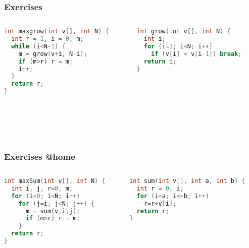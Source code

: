 \documentclass[aspectratio=169]{beamer}
\begin{document}
\begin{frame}[fragile]\frametitle{Exercises}
\begin{columns}
\begin{column}{0.48\textwidth}
\begin{lstlisting}[language=C++,emph={maxgrow,grow}]
int maxgrow(int v[], int N) {
  int r = 1, i = 0, m;
  while (i<N-1) {
    m = grow(v+i, N-i);
    if (m>r) r = m;
    i++;
  }
  return r;
}
\end{lstlisting}
\end{column}
\begin{column}{0.48\textwidth}
\begin{lstlisting}[language=C++,emph={grow}]
int grow(int v[], int N) {
  int i;
  for (i=1; i<N; i++)
    if (v[i] < v[i-1]) break;
  return i;
}

\end{lstlisting}
\end{column}
\end{columns}

~\\[-6mm]
~\\[-11mm]
~\\[-12mm]

\end{frame}


\begin{frame}[fragile]\frametitle{Exercises @home}
\begin{columns}
\begin{column}{0.48\textwidth}
\begin{lstlisting}[language=C++,emph={maxSum,sum}]
int maxSum(int v[], int N) {
  int i, j, r=0, m;
  for (i=0; i<N; i++)
    for (j=i; j<N; j++) {
      m = sum(v,i,j);
      if (m>r) r = m;
    }
  return r;
}
\end{lstlisting}
\end{column}
\begin{column}{0.48\textwidth}
\begin{lstlisting}[language=C++,emph={sum}]
int sum(int v[], int a, int b) {
  int r = 0, i;
  for (i=a; i<=b; i++)
    r=r+v[i];
  return r;
}


\end{lstlisting}
\end{column}
\end{columns}
%


\end{frame}
\end{document}

